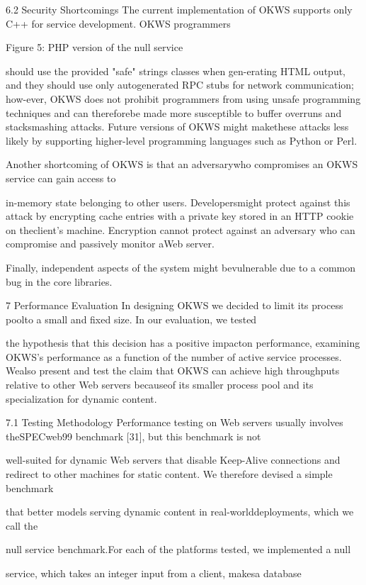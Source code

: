 6.2 Security Shortcomings
The current implementation of OKWS supports only C++ for service development.
OKWS programmers

Figure 5: PHP version of the null service

should use the provided "safe" strings classes when gen-erating HTML output, and they should use only autogenerated RPC stubs for network communication; how-ever, OKWS does not prohibit programmers from using unsafe programming techniques and can thereforebe made more susceptible to buffer overruns and stacksmashing attacks. Future versions of OKWS might makethese attacks less likely by supporting higher-level programming languages such as Python or Perl.

Another shortcoming of OKWS is that an adversarywho compromises an OKWS service can gain access to

in-memory state belonging to other users. Developersmight protect against this attack by encrypting cache entries with a private key stored in an HTTP cookie on theclient's machine. Encryption cannot protect against an
adversary who can compromise and passively monitor aWeb server.

Finally, independent aspects of the system might bevulnerable due to a common bug in the core libraries.

7 Performance Evaluation
In designing OKWS we decided to limit its process poolto a small and fixed size. In our evaluation, we tested

the hypothesis that this decision has a positive impacton performance, examining OKWS's performance as a
function of the number of active service processes. Wealso present and test the claim that OKWS can achieve
high throughputs relative to other Web servers becauseof its smaller process pool and its specialization for dynamic content.

7.1 Testing Methodology
Performance testing on Web servers usually involves theSPECweb99 benchmark [31], but this benchmark is not

well-suited for dynamic Web servers that disable Keep-Alive connections and redirect to other machines for
static content. We therefore devised a simple benchmark

that better models serving dynamic content in real-worlddeployments, which we call the

null service benchmark.For each of the platforms tested, we implemented a null

service, which takes an integer input from a client, makesa database

